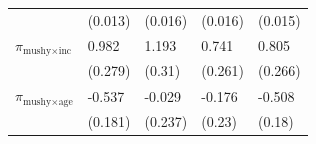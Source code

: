 \begin{tabular}{lllll}
                                                         & (0.013)          & (0.016)                                           & (0.016)                   & (0.015)           \\
 $\pi_{\text{mushy} \times \text{inc}}$                  & 0.982            & 1.193                                             & 0.741                     & 0.805             \\
                                                         & (0.279)          & (0.31)                                            & (0.261)                   & (0.266)           \\
 $\pi_{\text{mushy} \times \text{age}}$                  & -0.537           & -0.029                                            & -0.176                    & -0.508            \\
                                                         & (0.181)          & (0.237)                                           & (0.23)                    & (0.18)            \\
\midrule
\end{tabular}
